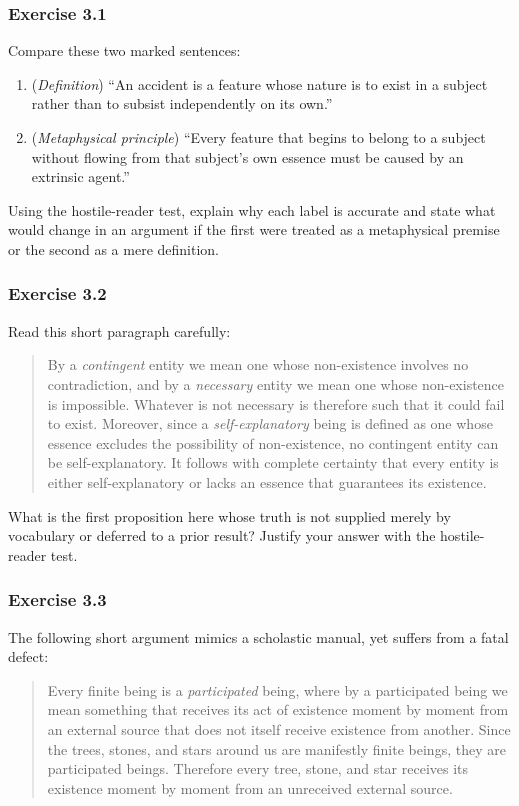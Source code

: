 \subsubsection*{Exercise 3.1}
Compare these two marked sentences:
\begin{enumerate}
\item (\emph{Definition}) ``An accident is a feature whose nature is to exist in a subject rather than to subsist independently on its own.''
\item (\emph{Metaphysical principle}) ``Every feature that begins to belong to a subject without flowing from that subject's own essence must be caused by an extrinsic agent.''
\end{enumerate}
Using the hostile-reader test, explain why each label is accurate and state what would change in an argument if the first were treated as a metaphysical premise or the second as a mere definition.

\subsubsection*{Exercise 3.2}
Read this short paragraph carefully:

\begin{quote}
By a \emph{contingent} entity we mean one whose non-existence involves no contradiction, and by a \emph{necessary} entity we mean one whose non-existence is impossible. Whatever is not necessary is therefore such that it could fail to exist. Moreover, since a \emph{self-explanatory} being is defined as one whose essence excludes the possibility of non-existence, no contingent entity can be self-explanatory. It follows with complete certainty that every entity is either self-explanatory or lacks an essence that guarantees its existence.
\end{quote}

What is the first proposition here whose truth is not supplied merely by vocabulary or deferred to a prior result? Justify your answer with the hostile-reader test.

\subsubsection*{Exercise 3.3}
The following short argument mimics a scholastic manual, yet suffers from a fatal defect:

\begin{quote}
Every finite being is a \emph{participated} being, where by a participated being we mean something that receives its act of existence moment by moment from an external source that does not itself receive existence from another. Since the trees, stones, and stars around us are manifestly finite beings, they are participated beings. Therefore every tree, stone, and star receives its existence moment by moment from an unreceived external source.
\end{quote}

